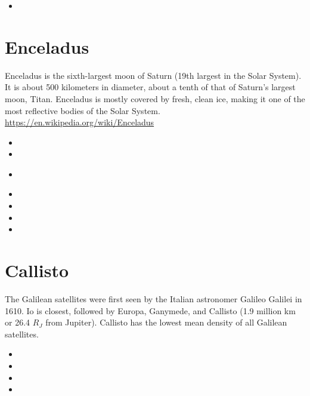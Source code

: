 \begin{small}
\begin{itemize}
\item[\twothousandtwentytwo] 
\end{itemize}
\end{small}

\section{Enceladus}

Enceladus is the sixth-largest moon of Saturn (19th largest in the Solar System). 
It is about 500 kilometers in diameter, about a tenth of that of Saturn's largest moon, Titan. 
Enceladus is mostly covered by fresh, clean ice, making it one of the most reflective bodies 
of the Solar System. 
\url{https://en.wikipedia.org/wiki/Enceladus}

\begin{small}
\begin{itemize}
\item[\twothousandeight] 
\item[\twothousandnine]
\item[\twothousandten]
\\ 
\item[\twothousandtwelve] 
\item[\twothousandthirteen] 
\item[\twothousandfourteen]
\item[\twothousandtwentytwo] 
\end{itemize}
\end{small}

\section{Callisto}

The Galilean satellites were first seen by the Italian astronomer Galileo Galilei in 1610. 
Io is closest, followed by Europa, Ganymede, and Callisto (1.9 million km or
26.4 $R_J$ from Jupiter). Callisto has the lowest mean density of all Galilean satellites.

\begin{small}
\begin{itemize}
\item[1988]
\item[\twothousandfour]
\item[\twothousandfive]
\item[\twothousandsix]
\end{itemize}
\end{small}

